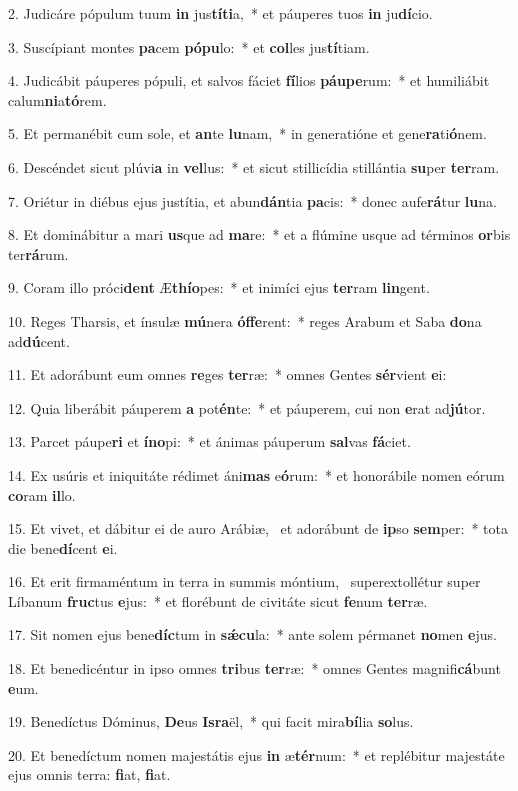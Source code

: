 2. Judicáre pópulum tuum \textbf{in} jus\textbf{tí}\textbf{ti}a,~*  et páuperes tuos \textbf{in} ju\textbf{dí}cio.\

3. Suscípiant montes \textbf{pa}cem \textbf{pó}\textbf{pu}lo:~*  et \textbf{col}les jus\textbf{tí}tiam.\

4. Judicábit páuperes pópuli, et salvos fáciet \textbf{fí}lios \textbf{páu}\textbf{pe}rum:~*  et humiliábit calum\textbf{ni}a\textbf{tó}rem.\

5. Et permanébit cum sole, et \textbf{an}te \textbf{lu}nam,~*  in generatióne et gene\textbf{ra}ti\textbf{ó}nem.\

6. Descéndet sicut plúvi\textbf{a} in \textbf{vel}lus:~*  et sicut stillicídia stillántia \textbf{su}per \textbf{ter}ram.\

7. Oriétur in diébus ejus justítia, et abun\textbf{dán}tia \textbf{pa}cis:~*  donec aufe\textbf{rá}tur \textbf{lu}na.\

8. Et dominábitur a mari \textbf{us}que ad \textbf{ma}re:~*  et a flúmine usque ad términos \textbf{or}bis ter\textbf{rá}rum.\

9. Coram illo próci\textbf{dent} Æ\textbf{thí}\textbf{o}pes:~*  et inimíci ejus \textbf{ter}ram \textbf{lin}gent.\

10. Reges Tharsis, et ínsulæ \textbf{mú}nera \textbf{óf}\textbf{fe}rent:~*  reges Arabum et Saba \textbf{do}na ad\textbf{dú}cent.\

11. Et adorábunt eum omnes \textbf{re}ges \textbf{ter}ræ:~*  omnes Gentes \textbf{sér}vient \textbf{e}i:\

12. Quia liberábit páuperem \textbf{a} pot\textbf{én}te:~*  et páuperem, cui non \textbf{e}rat ad\textbf{jú}tor.\

13. Parcet páupe\textbf{ri} et \textbf{ín}\textbf{o}pi:~*  et ánimas páuperum \textbf{sal}vas \textbf{fá}ciet.\

14. Ex usúris et iniquitáte rédimet áni\textbf{mas} e\textbf{ó}rum:~*  et honorábile nomen eórum \textbf{co}ram \textbf{il}lo.\

15. Et vivet, et dábitur ei de auro Arábiæ, \dag\  et adorábunt de \textbf{ip}so \textbf{sem}per:~*  tota die bene\textbf{dí}cent \textbf{e}i.\

16. Et erit firmaméntum in terra in summis móntium, \dag\  superextollétur super Líbanum \textbf{fruc}tus \textbf{e}jus:~*  et florébunt de civitáte sicut \textbf{fe}num \textbf{ter}ræ.\

17. Sit nomen ejus bene\textbf{díc}tum in \textbf{sǽ}\textbf{cu}la:~*  ante solem pérmanet \textbf{no}men \textbf{e}jus.\

18. Et benedicéntur in ipso omnes \textbf{tri}bus \textbf{ter}ræ:~*  omnes Gentes magnifi\textbf{cá}bunt \textbf{e}um.\

19. Benedíctus Dóminus, \textbf{De}us \textbf{Is}\textbf{ra}ël,~*  qui facit mira\textbf{bí}lia \textbf{so}lus.\

20. Et benedíctum nomen majestátis ejus \textbf{in} æ\textbf{tér}num:~*  et replébitur majestáte ejus omnis terra: \textbf{fi}at, \textbf{fi}at.\

